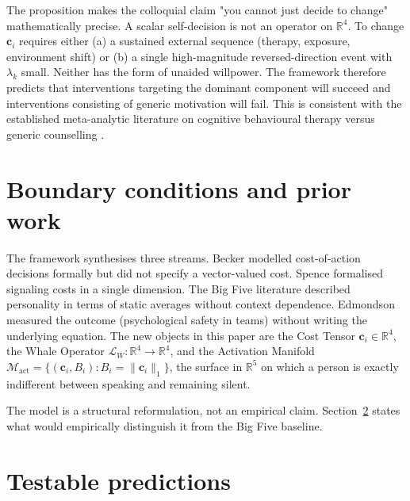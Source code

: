 \documentclass[12pt,a4paper]{article}
\begin{document}
\vspace{0.4em}

The proposition makes the colloquial claim "you cannot just decide to change" mathematically precise. A scalar self-decision is not an operator on $\mathbb{R}^4$. To change $\mathbf{c}_i$ requires either (a) a sustained external sequence (therapy, exposure, environment shift) or (b) a single high-magnitude reversed-direction event with $\lambda_k$ small. Neither has the form of unaided willpower. The framework therefore predicts that interventions targeting the dominant component will succeed and interventions consisting of generic motivation will fail. This is consistent with the established meta-analytic literature on cognitive behavioural therapy versus generic counselling \cite{butler2006empirical}.

\section{Boundary conditions and prior work}
\label{sec:prior}

The framework synthesises three streams. Becker \cite{becker1968crime} modelled cost-of-action decisions formally but did not specify a vector-valued cost. Spence \cite{spence1973job} formalised signaling costs in a single dimension. The Big Five literature \cite{costa1992neo,goldberg1993structure} described personality in terms of static averages without context dependence. Edmondson \cite{edmondson1999psychological} measured the outcome (psychological safety in teams) without writing the underlying equation. The new objects in this paper are the Cost Tensor $\mathbf{c}_i \in \mathbb{R}^4$, the Whale Operator $\mathcal{L}_W : \mathbb{R}^4 \to \mathbb{R}^4$, and the Activation Manifold $\mathcal{M}_{\mathrm{act}} = \{(\mathbf{c}_i, B_i) : B_i = \|\mathbf{c}_i\|_1\}$, the surface in $\mathbb{R}^5$ on which a person is exactly indifferent between speaking and remaining silent.

The model is a structural reformulation, not an empirical claim. Section~\ref{sec:tests} states what would empirically distinguish it from the Big Five baseline.

\section{Testable predictions}
\label{sec:tests}
\end{document}
